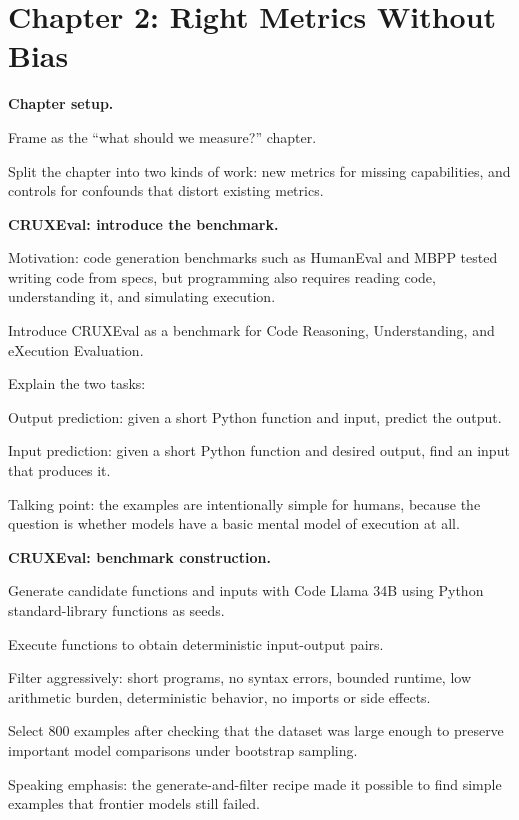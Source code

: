 \documentclass[10pt,twocolumn]{article}
\let\olditemize\itemize
\let\oldenditemize\enditemize
\renewenvironment{itemize}{\olditemize
  \setlength{\itemsep}{1pt}
  \setlength{\parskip}{0pt}
  \setlength{\parsep}{0pt}
  \setlength{\topsep}{2pt}
}{\oldenditemize}
\begin{document}
\section*{Chapter 2: Right Metrics Without Bias}

\textbf{Chapter setup.}
\begin{itemize}
  \item Frame as the ``what should we measure?'' chapter.
  \item Split the chapter into two kinds of work: new metrics for missing capabilities, and controls for confounds that distort existing metrics.
\end{itemize}

\textbf{CRUXEval: introduce the benchmark.}
\begin{itemize}
  \item Motivation: code generation benchmarks such as HumanEval and MBPP tested writing code from specs, but programming also requires reading code, understanding it, and simulating execution.
  \item Introduce CRUXEval as a benchmark for Code Reasoning, Understanding, and eXecution Evaluation.
  \item Explain the two tasks:
  \begin{itemize}
    \item Output prediction: given a short Python function and input, predict the output.
    \item Input prediction: given a short Python function and desired output, find an input that produces it.
  \end{itemize}
  \item Talking point: the examples are intentionally simple for humans, because the question is whether models have a basic mental model of execution at all.
\end{itemize}

\textbf{CRUXEval: benchmark construction.}
\begin{itemize}
  \item Generate candidate functions and inputs with Code Llama 34B using Python standard-library functions as seeds.
  \item Execute functions to obtain deterministic input-output pairs.
  \item Filter aggressively: short programs, no syntax errors, bounded runtime, low arithmetic burden, deterministic behavior, no imports or side effects.
  \item Select 800 examples after checking that the dataset was large enough to preserve important model comparisons under bootstrap sampling.
  \item Speaking emphasis: the generate-and-filter recipe made it possible to find simple examples that frontier models still failed.
\end{itemize}
\end{document}
